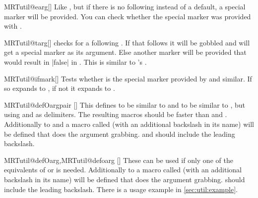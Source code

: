 \begin{describemacro}{MRTutil@earg}[]
  Like , but if there is no  following instead of a
  default, a special marker will be provided. You can check whether the special
  marker was provided with .
\end{describemacro}

\begin{describemacro}{MRTutil@targ}[]
  checks for a following . If that  follows it will be
  gobbled and  will get a special marker as its argument. Else
  another marker will be provided that would result in |false| in
  . This is similar to \LaTeXe's .
\end{describemacro}

\begin{describemacro}{MRTutil@ifmark}[]
  Tests whether  is the special marker provided by 
  and similar. If so expands to , if not it expands to .
\end{describemacro}

\begin{describemacro}{MRTutil@defOargpair}
  []
  This defines  to be similar to  and  to
  be similar to , but using  and  as
  delimiters. The resulting macros should be faster than  and
  . Additionally to  and  a macro called
   (with an additional backslash in its name) will be
  defined that does the argument grabbing.  and  should
  include the leading backslash.
\end{describemacro}

\begin{describemacro}{MRTutil@defOarg,MRTutil@defoarg}
  []
  These can be used if only one of the equivalents of  or
   is needed. Additionally to  a macro called
   (with an additional backslash in its name) will be
  defined that does the argument grabbing.  should include the leading
  backslash. There is a usage example in \autoref{sec:util:example}.
\end{describemacro}


